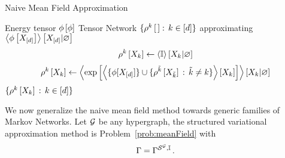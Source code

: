 \begin{algorithm}[h!]
    \caption{Naive Mean Field Approximation}\label{alg:NMF}
    \begin{algorithmic}
        \Require Energy tensor $\phi\left[\phi\right]$
        \Ensure Tensor Network $\{\rho^{k}\left[\,\right] : \, k\in[d]\}$ approximating $\left\langle \phi\left[X_{[d]}\right]\right\rangle \left[ X_{[d]} | \varnothing \right]$
        \iosepline
        \ForAll{$\catenumeratorin$}
            \State
            \begin{align*}
                \rho^{k}\left[X_{k}\right]
                \leftarrow \left\langle \mathbb{I}\right\rangle \left[ X_{k} | \varnothing \right]
            \end{align*}
        \EndFor
            \ForAll{$\catenumeratorin$}
                \State
                \[ \rho^{k}\left[X_{k}\right]
                \leftarrow \left\langle  \mathrm{exp}\left[ \left\langle  \{\phi[X_{[d]}] \}\cup
                \{\rho^{\tilde{k}}\left[X_{\tilde{k}}\right] \, : \, \tilde{k}\neq k\} \right\rangle \left[ X_{k} \right] \right]
                \right\rangle \left[ X_{k} | \varnothing \right] \]
            \EndFor
        \EndWhile
        \State \Return $\{\rho^{k}\left[X_{k}\right] \, : \, k\in[d]\}$
    \end{algorithmic}
\end{algorithm}




We now generalize the naive mean field method towards generic families of Markov Networks.
Let $\mathcal{G}$ be any hypergraph, the structured variational approximation method is Problem~\eqref{prob:meanField} with
\begin{align*}
    \Gamma = \Gamma^{\mathcal{S}^{\mathcal{G}},\mathbb{I}} \, .
\end{align*}

